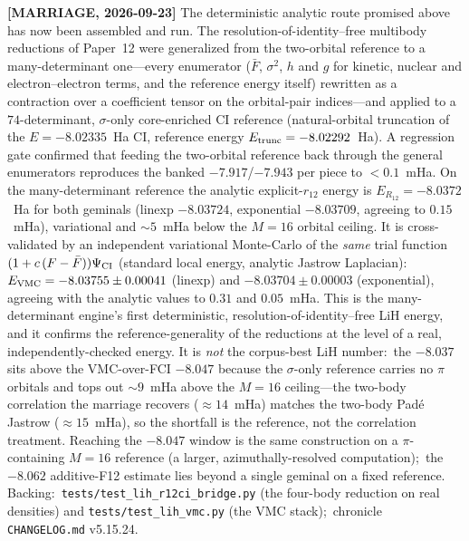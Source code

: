 \documentclass[aps,pra,twocolumn,superscriptaddress,longbibliography]{revtex4-2}
\begin{document}
\textbf{[MARRIAGE, 2026-09-23]}  The deterministic analytic route promised above
has now been assembled and run.  The resolution-of-identity--free multibody
reductions of Paper~12 were generalized from the two-orbital reference to a
many-determinant one---every enumerator ($\bar F$, $\sigma^2$, $h$ and $g$ for
kinetic, nuclear and electron--electron terms, and the reference energy itself)
rewritten as a contraction over a coefficient tensor on the orbital-pair
indices---and applied to a $74$-determinant, $\sigma$-only core-enriched CI
reference (natural-orbital truncation of the $E=-8.02335$~Ha CI, reference
energy $E_{\rm trunc}=-8.02292$~Ha).  A regression gate confirmed that feeding
the two-orbital reference back through the general enumerators reproduces the
banked $-7.917$/$-7.943$ per piece to $<0.1$~mHa.  On the many-determinant
reference the analytic explicit-$r_{12}$ energy is
$E_{R_{12}}=\mathbf{-8.0372}$~Ha for both geminals (linexp $-8.03724$,
exponential $-8.03709$, agreeing to $0.15$~mHa), variational and $\sim\!5$~mHa
below the $M=16$ orbital ceiling.  It is cross-validated by an independent
variational Monte-Carlo of the \emph{same} trial function
$(1+c\,(F-\bar F))\Psi_{\rm CI}$ (standard local energy, analytic Jastrow
Laplacian):\ $E_{\rm VMC}=-8.03755\pm0.00041$ (linexp) and
$-8.03704\pm0.00003$ (exponential), agreeing with the analytic values to
$0.31$ and $0.05$~mHa.  This is the many-determinant engine's first
deterministic, resolution-of-identity--free LiH energy, and it confirms
the reference-generality of the reductions at the level of a real,
independently-checked energy.  It is \emph{not} the corpus-best LiH number:\ the
$-8.037$ sits above the VMC-over-FCI $-8.047$ because the $\sigma$-only reference
carries no $\pi$ orbitals and tops out $\sim\!9$~mHa above the $M=16$ ceiling---the
two-body correlation the marriage recovers ($\approx14$~mHa) matches the
two-body Pad\'e Jastrow ($\approx15$~mHa), so the shortfall is the reference, not
the correlation treatment.  Reaching the $-8.047$ window is the same construction
on a $\pi$-containing $M=16$ reference (a larger, azimuthally-resolved
computation);\ the $-8.062$ additive-F12 estimate lies beyond a single geminal on
a fixed reference.  Backing:\ \texttt{tests/test\_lih\_r12ci\_bridge.py} (the
four-body reduction on real densities) and \texttt{tests/test\_lih\_vmc.py} (the
VMC stack);\ chronicle \texttt{CHANGELOG.md} v5.15.24.
\end{document}
